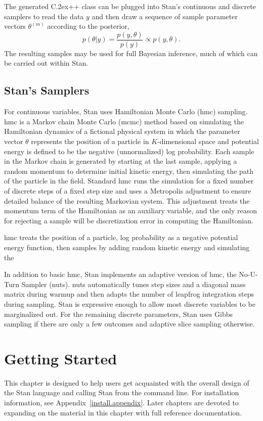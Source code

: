 \documentclass[10pt]{report}
\newcommand{\Stan}{Stan\xspace}
\newcommand*{\Cpp}{C\raise.2ex\hbox{\footnotesize ++}\xspace} %
\newcommand{\acronym}[1]{{\sc #1}\xspace}
\newcommand{\MCMC}{\acronym{mcmc}}
\newcommand{\HMC}{\acronym{hmc}}
\newcommand{\NUTS}{\acronym{nuts}}
\newcommand{\refappendix}[1]{Appendix~\ref{#1.appendix}}
\begin{document}
The generated \Cpp class can be plugged into Stan's continuous and
discrete samplers to read the data $y$ and then draw a sequence of
sample parameter vectors $\theta^{(m)}$ according to the posterior,
\[
p(\theta|y) = \frac{p(y,\theta)}{p(y)} \propto p(y,\theta).
\]
The resulting samples may be used for full Bayesian inference, much of
which can be carried out within Stan.

\section{\Stan's Samplers}

For continuous variables, Stan uses Hamiltonian Monte Carlo (\HMC)
sampling. \HMC is a Markov chain Monte Carlo (\MCMC) method based on
simulating the Hamiltonian dynamics of a fictional physical system in
which the parameter vector $\theta$ represents the position of a
particle in $K$-dimensional space and potential energy is defined to
be the negative (unnormalized) log probability.  Each sample in the
Markov chain is generated by starting at the last sample, applying a
random momentum to determine initial kinetic energy, then simulating
the path of the particle in the field.  Standard \HMC runs the
simulation for a fixed number of discrete steps of a fixed step size
and uses a Metropolis adjustment to ensure detailed balance of the
resulting Markovian system.  This adjustment treats the momentum term
of the Hamiltonian as an auxiliary variable, and the only reason for
rejecting a sample will be discretization error in computing the
Hamiltonian.

\HMC treats the position of a particle, 
log probability as a negative potential
energy function, then samples by adding random kinetic energy and
simulating the 

In addition to basic \HMC, Stan implements an adaptive
version of \HMC, the No-U-Turn Sampler (\NUTS).  \NUTS automatically
tunes step sizes and a diagonal mass matrix during warmup and then
adapts the number of leapfrog integration steps during sampling.
Stan is expressive enough to allow most discrete variables to be
marginalized out.  For the remaining discrete parameters, Stan uses
Gibbs sampling if there are only a few outcomes and adaptive slice
sampling otherwise.


\chapter{Getting Started}

This chapter is designed to help users get acquainted with the overall
design of the \Stan language and calling \Stan from the command line.
For installation information, see \refappendix{install}.
Later chapters are devoted to expanding on the material in this
chapter with full reference documentation.
\end{document}
